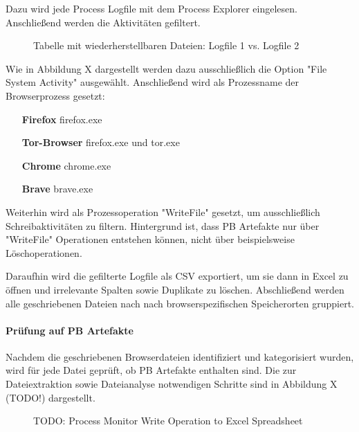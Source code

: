 Dazu wird jede Process Logfile mit dem Process Explorer eingelesen. Anschließend werden die Aktivitäten gefiltert.
\begin{figure}[h!]
	\centerline{}
	\caption{Tabelle mit wiederherstellbaren Dateien: Logfile 1 vs. Logfile 2}
\end{figure}
Wie in Abbildung X dargestellt werden dazu ausschließlich die Option "File System Activity" ausgewählt.
Anschließend wird als Prozessname der Browserprozess gesetzt:
\begin{itemize}
\item[\textbf{Firefox}] firefox.exe
\item[\textbf{Tor-Browser}] firefox.exe und tor.exe
\item[\textbf{Chrome}] chrome.exe
\item[\textbf{Brave}] brave.exe
\end{itemize}
Weiterhin wird als Prozessoperation "WriteFile" gesetzt, um ausschließlich Schreibaktivitäten zu filtern. Hintergrund ist, dass PB Artefakte nur über "WriteFile" Operationen entstehen können, nicht über beispielsweise Löschoperationen.

Daraufhin wird die gefilterte Logfile als CSV exportiert, um sie dann in Excel zu öffnen und irrelevante Spalten sowie Duplikate zu löschen.
Abschließend werden alle geschriebenen Dateien nach nach browserspezifischen Speicherorten gruppiert.

\paragraph*{Prüfung auf PB Artefakte}
Nachdem die geschriebenen Browserdateien identifiziert und kategorisiert wurden, wird für jede Datei geprüft, ob PB Artefakte enthalten sind. Die zur Dateiextraktion sowie Dateianalyse notwendigen Schritte sind in Abbildung X (TODO!) dargestellt.
\begin{figure}[h!]
	\centering
	\small
	\centerline{\resizebox{\linewidth}{!}{}}
	\caption{TODO: Process Monitor Write Operation to Excel Spreadsheet}
	\label{fig:jes}
\end{figure}

